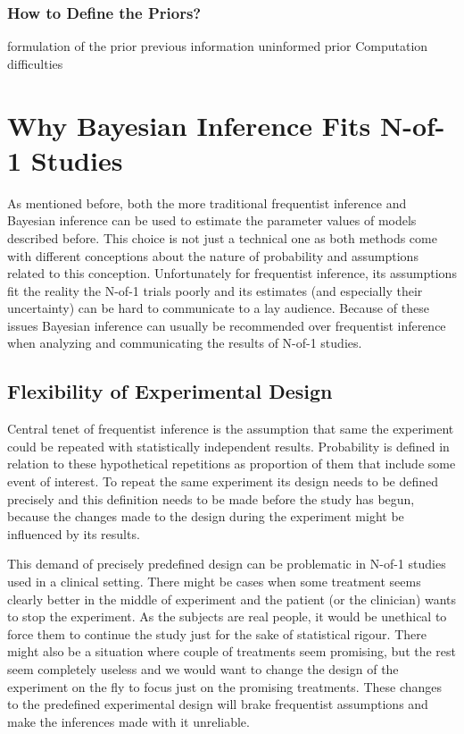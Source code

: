 \documentclass[12pt,a4paper,leqno]{report}
\theoremstyle{plain}
\theoremstyle{definition}
\theoremstyle{remark}
\begin{document}
\subsubsection{How to Define the Priors?}\label{bayesproblems}

formulation of the prior previous information uninformed prior Computation difficulties

\section{Why Bayesian Inference Fits N-of-1 Studies}\label{whybayes}

As mentioned before, both the more traditional frequentist inference and Bayesian
inference can be used to estimate the parameter values of models described before. This
choice is not just a technical one as both methods come with different conceptions about
the nature of probability and assumptions related to this conception. Unfortunately for
frequentist inference, its assumptions fit the reality the N-of-1 trials poorly and its
estimates (and especially their uncertainty) can be hard to communicate to a lay
audience. Because of these issues Bayesian inference can usually be recommended over
frequentist inference when analyzing and communicating the results of N-of-1 studies.

\subsection{Flexibility of Experimental Design}\label{whybayes}

Central tenet of frequentist inference is the assumption that same the experiment could
be repeated with statistically independent results. Probability is defined in relation to
these hypothetical repetitions as proportion of them that include some event of interest.
To repeat the same experiment its design needs to be defined precisely and this
definition needs to be made before the study has begun, because the changes made to the
design during the experiment might be influenced by its results.

This demand of precisely predefined design can be problematic in N-of-1 studies used in a
clinical setting. There might be cases when some treatment seems clearly better in the
middle of experiment and the patient (or the clinician) wants to stop the experiment. As
the subjects are real people, it would be unethical to force them to continue the study
just for the sake of statistical rigour. There might also be a situation where couple of
treatments seem promising, but the rest seem completely useless and we would want to
change the design of the experiment on the fly to focus just on the promising treatments.
These changes to the predefined experimental design will brake frequentist assumptions
and make the inferences made with it unreliable.
\end{document}
